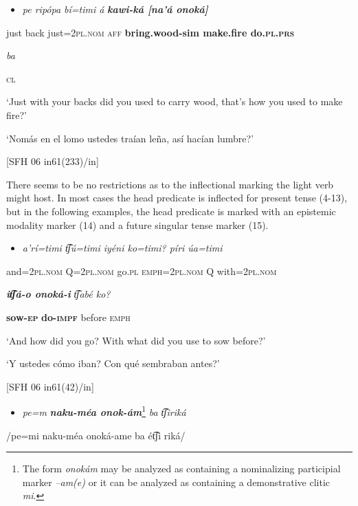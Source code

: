 \begin{itemize}
\item \textit{pe   ripópa   bí=timi   á} \textbf{\textit{kawi-ká     [na’á     onoká]}}   
\end{itemize}

  just  back  just=2\textsc{pl.nom  aff}  \textbf{bring.wood-sim  make.fire  do.\textsc{pl.prs}}  

  \textit{ba}

  \textsc{cl}

  ‘Just with your backs did you used to carry wood, that’s how you used to make fire?’

‘Nomás en el lomo ustedes traían leña, así hacían lumbre?’

  [SFH 06 in61(233)/in]

There seems to be no restrictions as to the inflectional marking the light verb might host. In most cases the head predicate is inflected for present tense (4-13), but in the following examples, the head predicate is marked with an epistemic modality marker (14) and a future singular tense marker (15).

\begin{itemize}
\item \textit{a’rí=timi  t͡ʃú=timi   iyéni  ko=timi?     píri   úa=timi}   
\end{itemize}

and=2\textsc{pl.nom}  Q=2\textsc{pl.nom}  go\textsc{.pl}  \textsc{emph}=2\textsc{pl.nom}  Q  with=2\textsc{pl.nom}    

\textbf{\textit{it͡ʃá-o     onoká-i}} \textit{t͡ʃabé   ko?} 

\textbf{sow-\textsc{ep}} \textbf{do-\textsc{impf}}  before  \textsc{emph}  

  ‘And how did you go? With what did you use to sow before?’

‘Y ustedes cómo iban? Con qué sembraban antes?’

  [SFH 06 in61(42)/in]

\begin{itemize}
\item \textit{pe=m} \textbf{\textit{naku-méa     onok-ám}}\footnote{The form \textit{onokám} may be analyzed as containing a nominalizing participial marker \textit{–am(e)} or it can be analyzed as containing a demonstrative clitic \textit{mi}.} \textit{ba   t͡ʃiriká}   
\end{itemize}

/pe=mi    naku-méa    onoká-ame    ba  ét͡ʃi  riká/

